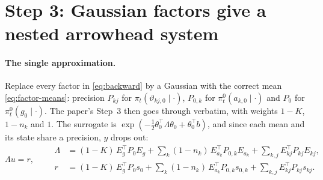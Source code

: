 \documentclass[11pt]{article}
\theoremstyle{definition}
\theoremstyle{remark}
\newcommand{\T}{\top}
\newcommand{\ak}{a_k}          %
\begin{document}
\section{Step 3: Gaussian factors give a nested arrowhead system}

\paragraph{The single approximation.} Replace every factor in \eqref{eq:backward}
by a Gaussian with the correct mean \eqref{eq:factor-means}: precision $P_{kj}$ for
$\pi_t(\vartheta_{kj,0}\mid\cdot)$, $P_{0,k}$ for $\pi_t^0(a_{k,0}\mid\cdot)$ and
$P_0$ for $\pi^0_t(g_0\mid\cdot)$. The paper's Step~3 then goes through
verbatim, with weights $1-K$, $1-n_k$ and $1$. The surrogate is
$\exp(-\tfrac12\theta_0^\T\Lambda\theta_0+\theta_0^\T b)$, and since each mean
and its state share a precision, $y$ drops out:
\begin{equation}\label{eq:system}
\Lambda u=r,\qquad
\begin{aligned}
\Lambda&=(1-K)\,E_g^\T P_0E_g+\sum_k(1-n_k)\,E_{\ak}^\T P_{0,k}E_{\ak}+\sum_{k,j}E_{kj}^\T P_{kj}E_{kj},\\
r&=(1-K)\,E_g^\T P_0s_0+\sum_k(1-n_k)\,E_{\ak}^\T P_{0,k}s_{0,k}+\sum_{k,j}E_{kj}^\T P_{kj}s_{kj}.
\end{aligned}
\end{equation}
\end{document}
